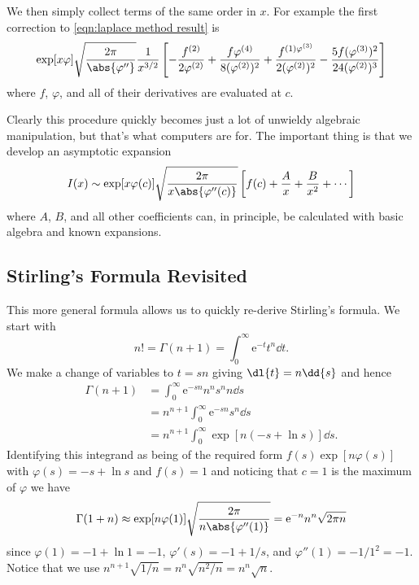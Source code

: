 \documentclass[fleqn]{NotesClass}
\newcommand*{\e}{\mathrm{e}}
\begin{document}
    We then simply collect terms of the same order in \(x\).
    For example the first correction to \cref{eqn:laplace method result} is
    \begin{equation}
        \exp[x\varphi] \sqrt{\frac{2\pi}{\abs{\varphi''}}}\frac{1}{x^{3/2}} \left[ -\frac{f^{(2)}}{2\varphi^{(2)}} + \frac{f\varphi^{(4)}}{8(\varphi^{(2)})^2} + \frac{f^{(1)\varphi^{(3)}}}{2(\varphi^{(2)})^2} - \frac{5f(\varphi^{(3)})^2}{24(\varphi^{(2)})^3} \right]
    \end{equation}
    where \(f\), \(\varphi\), and all of their derivatives are evaluated at \(c\).
    
    Clearly this procedure quickly becomes just a lot of unwieldy algebraic manipulation, but that's what computers are for.
    The important thing is that we develop an asymptotic expansion
    \begin{equation}
        I(x) \sim \exp[x\varphi(c)] \sqrt{\frac{2\pi}{x\abs{\varphi''(c)}}} \left[ f(c) + \frac{A}{x} + \frac{B}{x^2} + \dotsb \right]
    \end{equation}
    where \(A\), \(B\), and all other coefficients can, in principle, be calculated with basic algebra and known expansions.
    
    \subsection{Stirling's Formula Revisited}
    This more general formula allows us to quickly re-derive Stirling's formula.
    We start with
    \begin{equation}
        n! = \Gamma(n + 1) = \int_{0}^{\infty} \e^{-t}t^{n} \dd{t}.
    \end{equation}
    We make a change of variables to \(t = sn\) giving \(\dl{t} = n\dd{s}\) and hence
    \begin{align}
        \Gamma(n + 1) &= \int_{0}^{\infty} \e^{-sn}n^{n}s^{n} n\dd{s}\\
        &= n^{n+1}\int_0^\infty \e^{-sn} s^n\dd{s}\\
        &= n^{n+1} \int_0^{\infty} \exp[n(-s + \ln s)] \dd{s}.
    \end{align}
    Identifying this integrand as being of the required form \(f(s)\exp[n\varphi(s)]\) with \(\varphi(s) = -s + \ln s\) and \(f(s) = 1\) and noticing that \(c = 1\) is the maximum of \(\varphi\) we have
    \begin{equation}
        \Gamma(1 + n) \approx \exp[n\varphi(1)]\sqrt{\frac{2\pi}{n\abs{\varphi''(1)}}} = \e^{-n}n^{n}\sqrt{2\pi n}
    \end{equation}
    since \(\varphi(1) = -1 + \ln 1 = -1\), \(\varphi'(s) = -1 + 1/s\), and \(\varphi''(1) = -1/1^2 = -1\).
    Notice that we use \(n^{n+1}\sqrt{1/n} = n^{n}\sqrt{n^2/n} = n^n\sqrt{n}\).
    
\end{document}
